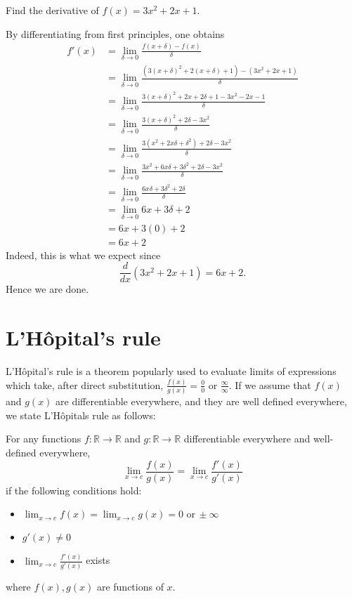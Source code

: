 \begin{example}
    Find the derivative of $f(x) = 3x^2 + 2x + 1$.
\end{example}
\begin{solution}
    By differentiating from first principles, one obtains
    \begin{equation*}
        \begin{split}
            f'(x) &= \lim_{\delta \to 0} \frac{f(x + \delta) - f(x)}{\delta} \\
            &= \lim_{\delta \to 0} \frac{(3(x + \delta)^2 + 2(x + \delta) + 1) - (3x^2 + 2x + 1)}{\delta} \\
            &= \lim_{\delta \to 0} \frac{3(x + \delta)^2 + 2x + 2\delta + 1 - 3x^2 - 2x - 1}{\delta} \\
            &= \lim_{\delta \to 0} \frac{3(x + \delta)^2 + 2\delta - 3x^2}{\delta} \\
            &= \lim_{\delta \to 0} \frac{3(x^2 + 2x\delta + \delta^2) + 2\delta - 3x^2}{\delta} \\
            &= \lim_{\delta \to 0} \frac{3x^2 + 6x\delta + 3\delta^2 + 2\delta - 3x^2}{\delta} \\
            &= \lim_{\delta \to 0} \frac{6x\delta + 3\delta^2 + 2\delta}{\delta} \\
            &= \lim_{\delta \to 0} 6x + 3\delta + 2 \\
            &= 6x + 3(0) + 2 \\
            &= 6x + 2
        \end{split}
    \end{equation*}
    Indeed, this is what we expect since \[\frac{d}{dx}(3x^2 + 2x + 1) = 6x + 2.\]
    Hence we are done.
\end{solution}

\section{L'H\^{o}pital's rule}
L'H\^{o}pital's rule is a theorem popularly used to evaluate limits of expressions which take,
after direct substitution, $\frac{f(x)}{g(x)} = \frac{0}{0}$ or $\frac{\infty}{\infty}$.
If we assume that $f(x)$ and $g(x)$ are differentiable everywhere, and they are well defined
everywhere, we state L'H\^{o}pitals rule as follows:

\begin{theorem}
    For any functions $f : \mathbb{R} \to \mathbb{R}$ and $g : \mathbb{R} \to \mathbb{R}$ differentiable everywhere and well-defined
    everywhere,
    \[\lim_{x \to c} \frac{f(x)}{g(x)} = \lim_{x \to c} \frac{f'(x)}{g'(x)}\]
    if the following conditions hold:
    \begin{itemize}
        \item $\lim_{x \to c} f(x) = \lim_{x \to c} g(x) = 0 \,\,\text{or}\,\pm \infty$
        \item $g'(x) \ne 0$
        \item $\lim_{x \to c} \frac{f'(x)}{g'(x)}$ exists
    \end{itemize}
    where $f(x),g(x)$ are functions of $x$.
\end{theorem}

